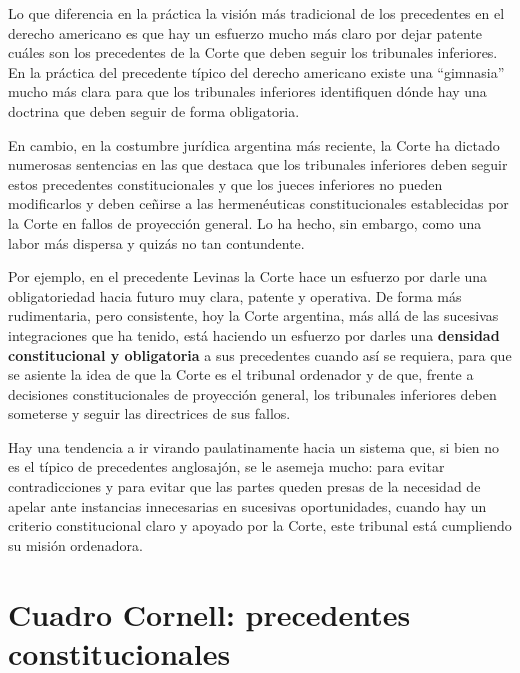 \documentclass[12pt,oneside]{book}
\begin{document}
Lo que diferencia en la práctica la visión más tradicional de los precedentes en el derecho americano es que hay un esfuerzo mucho más claro por dejar patente cuáles son los precedentes de la Corte que deben seguir los tribunales inferiores. En la práctica del precedente típico del derecho americano existe una ``gimnasia'' mucho más clara para que los tribunales inferiores identifiquen dónde hay una doctrina que deben seguir de forma obligatoria.

En cambio, en la costumbre jurídica argentina más reciente, la Corte ha dictado numerosas sentencias en las que destaca que los tribunales inferiores deben seguir estos precedentes constitucionales y que los jueces inferiores no pueden modificarlos y deben ceñirse a las hermenéuticas constitucionales establecidas por la Corte en fallos de proyección general. Lo ha hecho, sin embargo, como una labor más dispersa y quizás no tan contundente.

Por ejemplo, en el precedente Levinas la Corte hace un esfuerzo por darle una obligatoriedad hacia futuro muy clara, patente y operativa. De forma más rudimentaria, pero consistente, hoy la Corte argentina, más allá de las sucesivas integraciones que ha tenido, está haciendo un esfuerzo por darles una \textbf{densidad constitucional y obligatoria} a sus precedentes cuando así se requiera, para que se asiente la idea de que la Corte es el tribunal ordenador y de que, frente a decisiones constitucionales de proyección general, los tribunales inferiores deben someterse y seguir las directrices de sus fallos.

\begin{important}
Hay una tendencia a ir virando paulatinamente hacia un sistema que, si bien no es el típico de precedentes anglosajón, se le asemeja mucho: para evitar contradicciones y para evitar que las partes queden presas de la necesidad de apelar ante instancias innecesarias en sucesivas oportunidades, cuando hay un criterio constitucional claro y apoyado por la Corte, este tribunal está cumpliendo su misión ordenadora.
\end{important}

\section{Cuadro Cornell: precedentes constitucionales}
\end{document}
